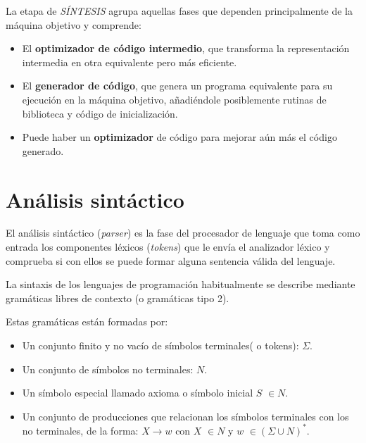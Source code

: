 La etapa de \textit{SÍNTESIS} agrupa aquellas fases que dependen principalmente de la máquina objetivo y comprende:	

\begin{itemize}

\item El \textbf{optimizador de código intermedio}, que transforma la representación intermedia en otra equivalente pero más eficiente.
\item El \textbf{generador de código}, que genera un programa equivalente para su ejecución en la máquina objetivo,  añadiéndole posiblemente rutinas de biblioteca y código de inicialización.
\item Puede haber un \textbf{optimizador }de código para mejorar aún más el código generado.

\end{itemize}


\section{Análisis sintáctico}

El análisis sintáctico (\textit{parser}) es la fase del procesador de lenguaje que toma como entrada los componentes léxicos (\textit{tokens}) que le envía el analizador léxico y comprueba si con ellos se puede formar alguna sentencia válida del lenguaje\cite{dragon}. 

La sintaxis de los lenguajes de programación habitualmente se describe mediante gramáticas libres de contexto (o gramáticas tipo 2).

Estas gramáticas están formadas por:
\begin{itemize}
	\item Un conjunto finito y no vacío de símbolos terminales( o tokens):  $\Sigma$.
	\item Un conjunto de símbolos no terminales:  $N$.
	\item  Un símbolo especial llamado axioma o símbolo inicial $S$ $\in N$.
	\item Un conjunto de producciones que relacionan los símbolos terminales con los no terminales, de la forma:
$ X\rightarrow w$ con $X$ $\in N$ y $w$ $\in(\Sigma\cup N)^{*}$.

\end{itemize}

%

